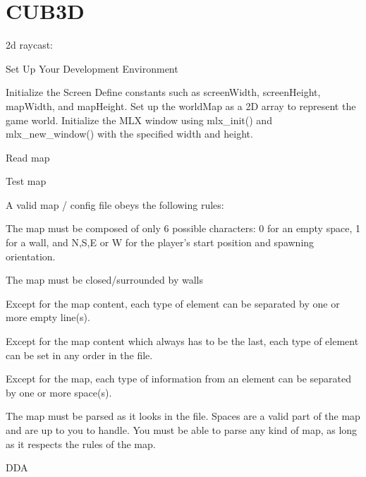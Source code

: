 \chapter{CUB3D}
\hypertarget{md__r_e_a_d_m_e}{}\label{md__r_e_a_d_m_e}
\label{md__r_e_a_d_m_e_autotoc_md0}%
%


2d raycast\+:
\begin{DoxyEnumerate}
\item Set Up Your Development Environment
\item Initialize the Screen Define constants such as screen\+Width, screen\+Height, map\+Width, and map\+Height. Set up the world\+Map as a 2D array to represent the game world. Initialize the MLX window using mlx\+\_\+init() and mlx\+\_\+new\+\_\+window() with the specified width and height.
\end{DoxyEnumerate}
\begin{DoxyEnumerate}
\item Read map
\item Test map 

\end{DoxyEnumerate}

A valid map / config file obeys the following rules\+:
\begin{DoxyEnumerate}
\item The map must be composed of only 6 possible characters\+: 0 for an empty space, 1 for a wall, and N,S,E or W for the player’s start position and spawning orientation.
\item The map must be closed/surrounded by walls
\item Except for the map content, each type of element can be separated by one or more empty line(s).
\item Except for the map content which always has to be the last, each type of element can be set in any order in the file.
\item Except for the map, each type of information from an element can be separated by one or more space(s).
\item The map must be parsed as it looks in the file. Spaces are a valid part of the map and are up to you to handle. You must be able to parse any kind of map, as long as it respects the rules of the map.
\end{DoxyEnumerate}

DDA


